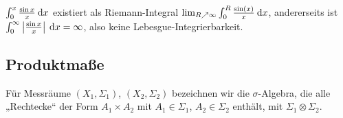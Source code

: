 \documentclass[skript.tex]{subfiles}
\begin{document}
	\begin{bsp*}
		$\int_0^x \frac{\sin x}{x} \: \mathrm{d} x$ existiert als Riemann-Integral
		$\lim_{R\nearrow\infty} \int_0^R \frac{\sin(x)}{x} \: \mathrm{d} x$, andererseits ist
		$\int_0^\infty\left|\frac{\sin x}{x}\right| \: \mathrm{d} x = \infty$, also keine
		Lebesgue-Integrierbarkeit.
	\end{bsp*}

	\subsection*{Produktmaße}
	\begin{notat}
		Für Messräume $(X_1,\Sigma_1)$, $(X_2,\Sigma_2)$ bezeichnen wir die
		$\sigma$-Algebra, die alle „Rechtecke“ der Form $A_1 \times A_2$ mit 
		$A_1 \in \Sigma_1$, $A_2 \in \Sigma_2$ enthält, mit $\Sigma_1 \otimes \Sigma_2$.
	\end{notat}
\end{document}
